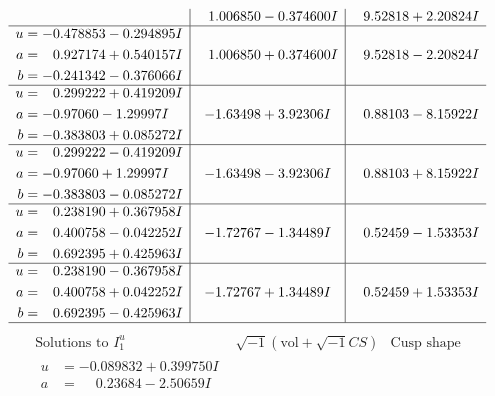 \documentclass[1p]{elsarticle_modified}
\theoremstyle{definition}
\newcommand{\I}{\sqrt{-1}}
\begin{document}
$$\begin{array}{c|c|c}
 & \phantom{-}1.006850 - 0.374600 I & \phantom{-}9.52818 + 2.20824 I \\ \hline\begin{aligned}
u &= -0.478853 - 0.294895 I \\
a &= \phantom{-}0.927174 + 0.540157 I \\
b &= -0.241342 - 0.376066 I\end{aligned}
 & \phantom{-}1.006850 + 0.374600 I & \phantom{-}9.52818 - 2.20824 I \\ \hline\begin{aligned}
u &= \phantom{-}0.299222 + 0.419209 I \\
a &= -0.97060 - 1.29997 I \\
b &= -0.383803 + 0.085272 I\end{aligned}
 & -1.63498 + 3.92306 I & \phantom{-}0.88103 - 8.15922 I \\ \hline\begin{aligned}
u &= \phantom{-}0.299222 - 0.419209 I \\
a &= -0.97060 + 1.29997 I \\
b &= -0.383803 - 0.085272 I\end{aligned}
 & -1.63498 - 3.92306 I & \phantom{-}0.88103 + 8.15922 I \\ \hline\begin{aligned}
u &= \phantom{-}0.238190 + 0.367958 I \\
a &= \phantom{-}0.400758 - 0.042252 I \\
b &= \phantom{-}0.692395 + 0.425963 I\end{aligned}
 & -1.72767 - 1.34489 I & \phantom{-}0.52459 - 1.53353 I \\ \hline\begin{aligned}
u &= \phantom{-}0.238190 - 0.367958 I \\
a &= \phantom{-}0.400758 + 0.042252 I \\
b &= \phantom{-}0.692395 - 0.425963 I\end{aligned}
 & -1.72767 + 1.34489 I & \phantom{-}0.52459 + 1.53353 I\\
 \hline 
 \end{array}$$\newpage$$\begin{array}{c|c|c}  
\text{Solutions to }I^u_{1}& \I (\text{vol} + \sqrt{-1}CS) & \text{Cusp shape}\\
 \hline 
\begin{aligned}
u &= -0.089832 + 0.399750 I \\
a &= \phantom{-}0.23684 - 2.50659 I \\

\end{aligned}
\end{array}$$
\end{document}
